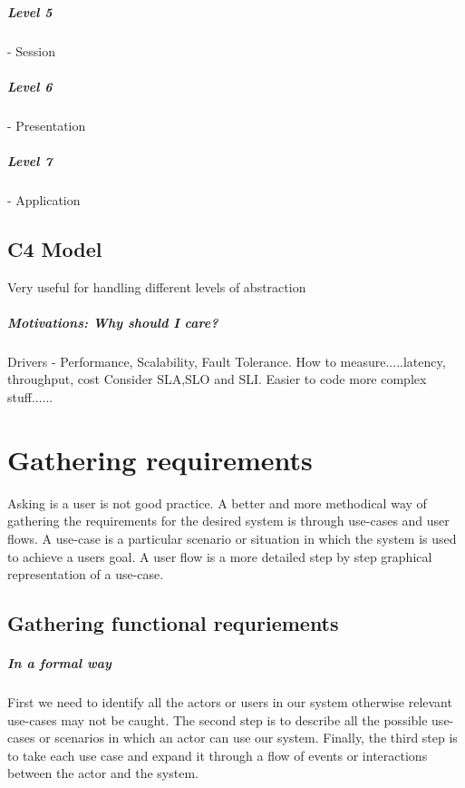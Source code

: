 \documentclass[a4paper, 11pt]{book}
\begin{document}
    \paragraph{Level 5} - Session

    \paragraph{Level 6} - Presentation

    \paragraph{Level 7} - Application


    \section{C4 Model}
    Very useful for handling different levels of abstraction

    \paragraph{Motivations: Why should I care?}
    Drivers - Performance, Scalability, Fault Tolerance.
    How to measure.....latency, throughput, cost
    Consider SLA,SLO and SLI.
    Easier to code more complex stuff......


    \chapter{Gathering requirements}
    Asking is a user is not good practice.
    A better and more methodical way of gathering the requirements for the desired system is through use-cases and user flows.
    A use-case is a particular scenario or situation in which the system is used to achieve a users goal.
    A user flow is a more detailed step by step graphical representation of a use-case.

    \section{Gathering functional requriements}

    \paragraph{In a formal way}

    First we need to identify all the actors or users in our system otherwise relevant use-cases may not be caught.
    The second step is to describe all the possible use-cases or scenarios in which an actor can use our system.
    Finally, the third step is to take each use case and expand it through a flow of events or interactions between the actor and the system.
\end{document}

